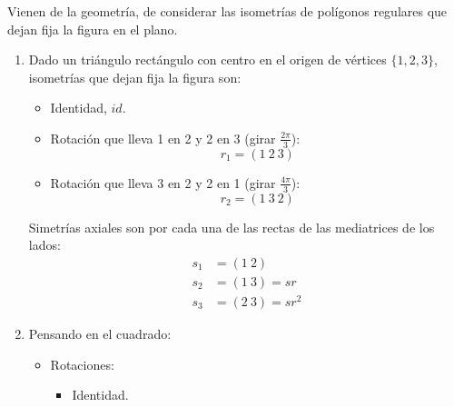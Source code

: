 \begin{ejemplo}
    Vienen de la geometría, de considerar las isometrías de polígonos regulares que dejan fija la figura en el plano.
\begin{center}
\end{center}
    \begin{enumerate}
        \item Dado un triángulo rectángulo con centro en el origen de vértices $\{1,2,3\}$, isometrías que dejan fija la figura son:
            \begin{itemize}
                \item Identidad, $id$.
                \item Rotación que lleva 1 en 2 y 2 en 3 (girar $\frac{2\pi}{3}$):
                    \begin{equation*}
                        r_1 = (1\ 2\ 3)
                    \end{equation*}
                \item Rotación que lleva 3 en 2 y 2 en 1 (girar $\frac{4\pi}{3}$):
                    \begin{equation*}
                        r_2 = (1\ 3\ 2)
                    \end{equation*}
            \end{itemize}
            Simetrías axiales son por cada una de las rectas de las mediatrices de los lados:
            \begin{align*}
                s_1 &= (1\ 2) \\
                s_2 &= (1\ 3) = sr \\
                s_3 &= (2\ 3) = sr^2
            \end{align*}
        \item Pensando en el cuadrado:
            \begin{itemize}
                \item Rotaciones:
                    \begin{itemize}
                        \item Identidad.

\end{itemize}
\end{itemize}
\end{enumerate}
\end{ejemplo}
